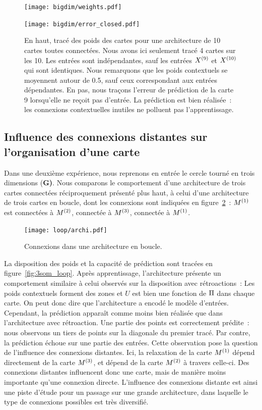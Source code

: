 \documentclass[../main]{subfiles}
\begin{document}
\begin{figure}[h!]
	\begin{minipage}{\textwidth}
	\texttt{[image: bigdim/weights.pdf]}
	\end{minipage}
\begin{minipage}{\textwidth}
	\centering\texttt{[image: bigdim/error\_closed.pdf]}
	\caption{En haut, tracé des poids des cartes pour une architecture de 10 cartes toutes connectées. Nous avons ici seulement tracé 4 cartes sur les 10. Les entrées sont indépendantes, sauf les entrées $X^{({9})}$ et $X^{({10})}$ qui sont identiques. Nous remarquons que les poids contextuels se moyennent autour de 0.5, sauf ceux correspondant aux entrées dépendantes. En pas, nous traçons l'erreur de prédiction de la carte 9 lorsqu'elle ne reçoit pas d'entrée. La prédiction est bien réalisée~: les connexions contextuelles inutiles ne polluent pas l'apprentissage. \label{fig:bigdim}}
\end{minipage}
\end{figure}

\subsection{Influence des connexions distantes sur l'organisation d'une carte}

Dans une deuxième expérience, nous reprenons en entrée le cercle tourné en trois dimensions (\textbf{G)}. 
Nous comparons le comportement d'une architecture de trois cartes connectées réciproquement présenté plus haut, à celui d'une architecture de trois cartes en boucle, dont les connexions sont indiquées en figure~\ref{fig:archi_loop}~: $M^{({1})}$ est connectées à $M^{({2})}$, connectée à $M^{({3})}$, connectée à $M^{({1})}$.
\begin{figure}[h!]
	\centering\texttt{[image: loop/archi.pdf]}
	\caption{Connexions dans une architecture en \og boucle\fg{}. \label{fig:archi_loop}}
\end{figure}

La disposition des poids et la capacité de prédiction sont tracées en figure~\ref{fig:3som_loop}.
Après apprentissage, l'architecture présente un comportement similaire à celui observés sur la disposition avec rétroactions~: Les poids contextuels forment des zones et $U$ est bien une fonction de $\Pi$ dans chaque carte. On peut donc dire que l'architecture a encodé le modèle d'entrées.
Cependant, la prédiction apparaît comme moins bien réalisée que dans l'architecture avec rétroaction. Une partie des points est correctement prédite~: nous observons un tiers de points sur la diagonale du premier tracé.
Par contre, la prédiction échoue sur une partie des entrées.
Cette observation pose la question de l'influence des connexions distantes. Ici, la relaxation de la carte $M^{({1})}$ dépend directement de la carte $M^{({3})}$, et dépend de la carte $M^{({2})}$ à travers celle-ci.
Des connexions distantes influencent donc une carte, mais de manière moins importante qu'une connexion directe. 
L'influence des connexions distante est ainsi une piste d'étude pour un passage sur une grande architecture, dans laquelle le type de connexions possibles est très diversifié.
\end{document}
